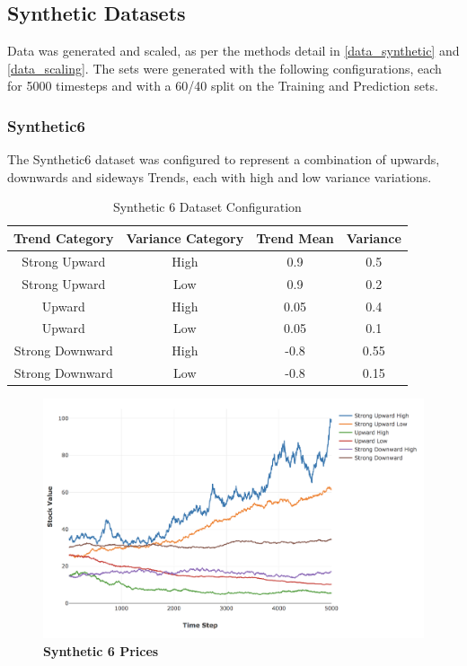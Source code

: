 \documentclass[a4paper,11pt,oneside]{article}
\theoremstyle{plain}
\theoremstyle{definition}
\begin{document}
	\subsection{Synthetic Datasets}
	
	Data was generated and scaled, as per the methods detail in \ref{data_synthetic} and \ref{data_scaling}. The sets were generated with the following configurations, each for 5000 timesteps and with a 60/40 split on the Training and Prediction sets.
	
	\subsubsection{Synthetic6} \label{dataset_synthetic6}
	
	The Synthetic6 dataset was configured to represent a combination of upwards, downwards and sideways Trends, each with high and low variance variations.
	
	\begin{table}[h]
		\centering
		\begin{tabular}{|c|c|c|c|}
			\hline
			\textbf{Trend Category} &\textbf{Variance Category} & \textbf{Trend Mean} & \textbf{Variance}\\\hline	
			{Strong Upward} & {High} & {0.9} & {0.5} \\\hline
			{Strong Upward} & {Low} & {0.9} & {0.2} \\\hline
			{Upward} & {High} & {0.05} & {0.4} \\\hline
			{Upward} & {Low} & {0.05} & {0.1} \\\hline
			{Strong Downward} & {High} & {-0.8} & {0.55} \\\hline
			{Strong Downward} & {Low} & {-0.8} & {0.15} \\\hline
		\end{tabular}
		\newline\newline
		\caption{Synthetic 6 Dataset Configuration}\label{tab_synth6}
	\end{table}
	
	\begin{figure}[H]
		\centering
		\includegraphics[scale=0.35]{images/results/prices/synthetic6_prices.png} 
		\caption[Synthetic 6 Prices]{\textbf{Synthetic 6 Prices}}
		\label{figure-synthetic6_prices}
	\end{figure}
	
\end{document}
